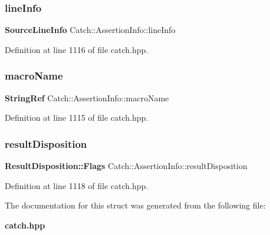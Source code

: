 \subsubsection{lineInfo}
{\footnotesize\ttfamily \textbf{ Source\+Line\+Info} Catch\+::\+Assertion\+Info\+::line\+Info}



Definition at line 1116 of file catch.\+hpp.

\mbox{\label{struct_catch_1_1_assertion_info_aaf3fbb9f1fe09c879ba3d877584e3056}} 
\subsubsection{macroName}
{\footnotesize\ttfamily \textbf{ String\+Ref} Catch\+::\+Assertion\+Info\+::macro\+Name}



Definition at line 1115 of file catch.\+hpp.

\mbox{\label{struct_catch_1_1_assertion_info_a60353b3632ab2f827162f2b2d6911073}} 
\subsubsection{resultDisposition}
{\footnotesize\ttfamily \textbf{ Result\+Disposition\+::\+Flags} Catch\+::\+Assertion\+Info\+::result\+Disposition}



Definition at line 1118 of file catch.\+hpp.



The documentation for this struct was generated from the following file\+:\begin{DoxyCompactItemize}
\item 
\textbf{ catch.\+hpp}\end{DoxyCompactItemize}
